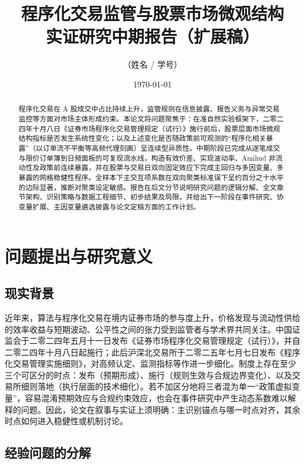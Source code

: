 \documentclass[UTF8, a4paper, 12pt]{ctexart}
\title{程序化交易监管与股票市场微观结构\\实证研究中期报告（扩展稿）}
\author{（姓名 / 学号）}
\date{\today}
\begin{document}
\maketitle

\begin{abstract}
\noindent
程序化交易在 A 股成交中占比持续上升，监管规则在信息披露、报告义务与异常交易监控等方面对市场主体形成约束。本论文将问题聚焦于：在准自然实验框架下，二零二四年十月八日《证券市场程序化交易管理规定（试行）》施行前后，股票层面市场微观结构指标是否发生系统性变化；以及上述变化是否随政策前可观测的“程序化相关暴露”（以订单流不平衡等高频代理刻画）呈连续型异质性。中期阶段已完成从逐笔成交与限价订单簿到日频面板的可复现流水线，构造有效价差、实现波动率、Amihud 非流动性及政策前连续暴露，并在股票与交易日双向固定效应下完成主回归与多因变量、多暴露的网格稳健性程序。全样本下主交互项系数在双向聚类标准误下呈约百分之十水平的边际显著，推断对聚类设定敏感。报告在后文分节说明研究问题的逻辑分解、全文章节架构、识别策略与数据工程细节、初步结果及局限，并给出下一阶段在事件研究、协变量扩展、主因变量遴选披露与论文定稿方面的工作计划。
\end{abstract}

\tableofcontents
\newpage

\section{问题提出与研究意义}

\subsection{现实背景}

近年来，算法与程序化交易在境内证券市场的参与度上升，价格发现与流动性供给的效率收益与短期波动、公平性之间的张力受到监管者与学术界共同关注。中国证监会于二零二四年五月十一日发布《证券市场程序化交易管理规定（试行）》，并自二零二四年十月八日起施行；此后沪深北交易所于二零二五年七月七日发布《程序化交易管理实施细则》，对高频认定、监测指标等作进一步细化。制度上存在至少三个可区分的时点：发布（预期形成）、施行（规则生效与合规边界变化）、以及交易所细则落地（执行层面的技术细化）。若不加区分地将三者混为单一“政策虚拟变量”，容易混淆预期效应与合规约束效应，也会在事件研究中产生动态系数难以解释的问题。因此，论文在叙事与实证上须明确：主识别锚点与哪一时点对齐，其余时点如何进入稳健性或机制讨论。

\subsection{经验问题的分解}
\end{document}
